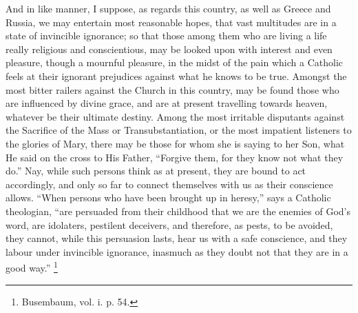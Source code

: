 And in like manner, I suppose, as regards this country, as well as
Greece and Russia, we may entertain most reasonable hopes, that vast
multitudes are in a state of invincible ignorance; so that those among
them who are living a life really religious and conscientious, may be
looked upon with interest and even pleasure, though a mournful
pleasure, in the midst of the pain which a Catholic feels at their
ignorant prejudices against what he knows to be true. Amongst the most
bitter railers against the Church in this country, may be found those
who are influenced by divine grace, and are at present travelling
towards heaven, whatever be their ultimate destiny. Among the most
irritable disputants against the Sacrifice of the Mass or
Transubstantiation, or the most impatient listeners to the glories of
Mary, there may be those for whom she is saying to her Son, what He
said on the cross to His Father, ``Forgive them, for they know not
what they do.'' Nay, while such persons think as at present, they
are bound to act accordingly, and only so far to connect themselves
with us as their conscience allows. ``When persons who have been
brought up in heresy,'' says a Catholic theologian, ``are
persuaded from their childhood that we are the enemies of God's word,
are idolaters, pestilent deceivers, and therefore, as pests, to be
avoided, they cannot, while this persuasion lasts, hear us with a safe
conscience, and they labour under invincible ignorance, inasmuch as
they doubt not that they are in a good way.'' \footnote{Busembaum, vol. i. p. 54.}

